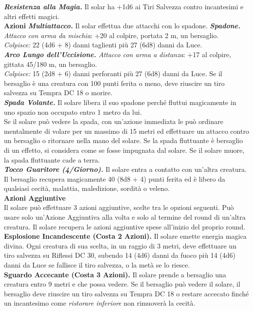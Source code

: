 \begin{multicols}{2}
\emph{\textbf{Resistenza alla Magia.}} Il solar ha +1d6 ai Tiri Salvezza contro incantesimi e altri effetti magici.\\
\smallskip\textbf{Azioni}
\emph{\textbf{Multiattacco.}} Il solar effettua due attacchi con lo spadone.
\emph{\textbf{Spadone.} Attacco con arma da mischia}: +20 al colpire, portata 2 m, un bersaglio.\\
\emph{Colpisce:} 22 (4d6 + 8) danni taglienti più 27 (6d8) danni da Luce.\\
\emph{\textbf{Arco Lungo dell'Uccisione.} Attacco con arma a distanza}: +17 al colpire, gittata 45/180 m, un bersaglio.\\
\emph{Colpisce:} 15 (2d8 + 6) danni perforanti più 27 (6d8) danni da Luce. Se il bersaglio è una creatura con 100 punti ferita o meno, deve riuscire un tiro salvezza su Tempra DC  18 o morire. \\
\emph{\textbf{Spada Volante.}} Il solare libera il suo spadone perché fluttui magicamente in uno spazio non occupato entro 1 metro da lui.\\
Se il solare può vedere la spada, con un'azione immediata le può ordinare mentalmente di volare per un massimo di 15 metri ed effettuare un attacco contro un bersaglio o ritornare nella mano del solare. Se la spada fluttuante è bersaglio di un effetto, si considera come se fosse impugnata dal solare. Se il solare muore, la spada fluttuante cade a terra.\\
\emph{\textbf{Tocco Guaritore (4/Giorno).}} Il solare entra a contatto con  un'altra creatura. Il bersaglio recupera magicamente 40 (8d8 + 4) punti ferita ed è libero da qualsiasi cecità, malattia, maledizione, sordità o veleno.\\
\textbf{Azioni Aggiuntive}\\
Il solare può effettuare 3 azioni aggiuntive, scelte tra le opzioni seguenti. Può usare solo un'Azione Aggiuntiva alla volta e solo al termine del round di un'altra creatura. Il solare recupera le azioni aggiuntive spese all'inizio del proprio round. \\
\textbf{Esplosione Incandescente (Costa 2 Azioni).} Il solare emette energia magica divina. Ogni creatura di sua scelta, in un raggio di 3 metri, deve effettuare un tiro salvezza su Riflessi DC  30, subendo 14 (4d6) danni da fuoco più 14 (4d6) danni da Luce se fallisce il tiro salvezza, o la metà se lo riesce. \\ 
\textbf{Sguardo Accecante (Costa 3 Azioni).} Il solare prende a bersaglio una creatura entro 9 metri e che possa vedere. Se il bersaglio può vedere il solare, il bersaglio deve riuscire un tiro salvezza su Tempra DC  18 o restare accecato finché un incantesimo come \emph{ristorare inferiore} non rimuoverà la cecità.\\

\end{multicols}
